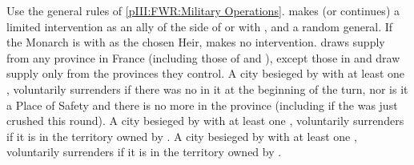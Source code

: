 \begin{digressions}



  \phmil
  \aparag Use the general rules of \ref{pIII:FWR:Military Operations}.
  \aparag \paysPalatinat makes (or continues) a limited intervention as an
  ally of the side of \leaderNavarre or  with
  \ARMY\faceplus, \LD and a random general. If the Monarch is  with  as the chosen Heir, \paysPalatinat makes no
  intervention.
  \aparag \FRA draws supply from any province in France (including those of
  \lig and \hug), except those in \REVOLT
  \aparag \lig and \hug draw supply only from the provinces they control.
  \bparag A city besieged by \FRA with at least one \ARMY \faceplus,
  voluntarily surrenders if there was no \REVOLT \faceplus in it at the
  beginning of the turn, nor is it a Place of Safety and there is no more
  \REVOLT in the province (including if the \REVOLT was just crushed this
  round).
  \bparag A city besieged by \lig with at least one \ARMY \faceplus,
  voluntarily surrenders if it is in the territory owned by \lig.
  \bparag A city besieged by \hug with at least one \ARMY \faceplus,
  voluntarily surrenders if it is in the territory owned by \hug.




\end{digressions}
